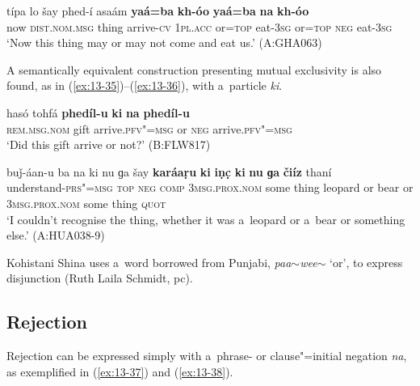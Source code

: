 \begin{exe}
\ex
\label{ex:13-34}
\gll típa lo šay phed-í asaám \textbf{yaá=ba} \textbf{kh-óo} \textbf{yaá=ba} \textbf{na} \textbf{kh-óo} \\
now \textsc{dist.nom.msg} thing arrive-\textsc{cv} \textsc{1pl.acc} or=\textsc{top} eat-\textsc{3sg} or=\textsc{top} \textsc{neg} eat-\textsc{3sg} \\
\glt `Now this thing may or may not come and eat us.' (A:GHA063) 
\end{exe}

 A semantically equivalent construction presenting mutual exclusivity is also found, as in (\ref{ex:13-35})--(\ref{ex:13-36}), with a~particle \textit{ki}. 

\begin{exe}
\ex
\label{ex:13-35}
\gll hasó tohfá \textbf{phedíl-u} \textbf{ki} \textbf{na} \textbf{phedíl-u} \\
\textsc{rem.msg.nom} gift arrive.\textsc{pfv"=msg} or \textsc{neg}  arrive.\textsc{pfv"=msg} \\
\glt `Did this gift arrive or not?' (B:FLW817)

\ex
\label{ex:13-36}
\gll buǰ-áan-u ba na ki nu ɡa šay \textbf{karáaṛu} \textbf{ki} \textbf{iṇc̣} \textbf{ki} \textbf{nu} \textbf{ɡa} \textbf{čiíz} thaní \\
understand-\textsc{prs"=msg} \textsc{top} \textsc{neg} \textsc{comp} \textsc{3msg.prox.nom}  some thing leopard or bear or \textsc{3msg.prox.nom} some thing \textsc{quot} \\
\glt `I couldn't recognise the thing, whether it was a~leopard or a~bear or something else.' (A:HUA038-9) 
\end{exe}

Kohistani Shina uses a~word borrowed from Punjabi, \textit{paa$\sim$wee$\sim$} `or', to express disjunction (Ruth Laila Schmidt, pc).


\subsection{Rejection}
\label{subsec:13-2-4}

 Rejection can be expressed simply with a~phrase- or clause"=initial negation \textit{na}, as exemplified in (\ref{ex:13-37}) and (\ref{ex:13-38}).

